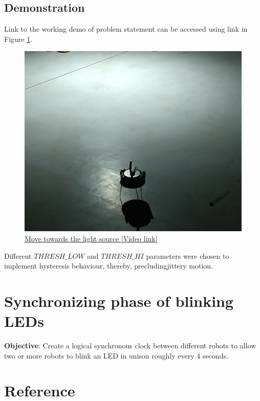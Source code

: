\documentclass{article}
\begin{document}
\subsection{Demonstration}
Link to the working demo of problem statement can be accessed using link in Figure \ref{fig:move_towards_the_light}.
\begin{figure}[H]
	\centering
	\includegraphics[scale=0.4]{images/move_towards_light}
	\caption{\href{https://www.google.com/url?sa=j&url=https\%3A\%2F\%2Fphotos.app.goo.gl\%2FnUNghDg4nJygpzUu5&uct=1551610784&usg=G0tZGJ7iMN79F5qGk1QMw5rfodM.}{Move towards the light source [Video link]}}
    \label{fig:move_towards_the_light}
\end{figure}
Different $THRESH\_LOW$ and $THRESH\_HI$ parameters were chosen to implement hysteresis behaviour, thereby, precludingjittery motion.

\section{Synchronizing phase of blinking LEDs}
\textbf{Objective}: Create a logical synchronous clock between different 
robots to allow two or more robots to blink an LED in unison roughly every 4 seconds.

\section{Reference}
    \printbibliography[heading=none]
\end{document}

